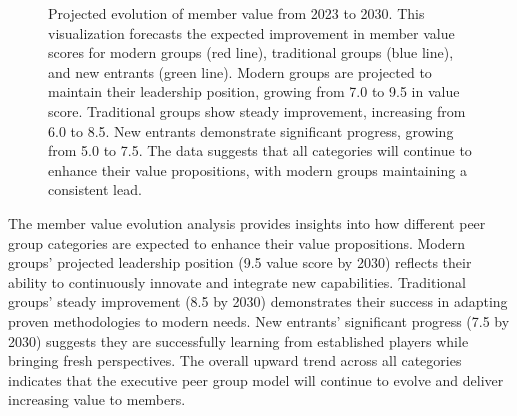 \documentclass[conference]{IEEEtran}
\begin{document}
\begin{figure}[t]
\centering
{}
\caption{Projected evolution of member value from 2023 to 2030. 
This visualization forecasts the expected improvement in member value scores for modern groups 
(red line), traditional groups (blue line), and new entrants (green line). Modern groups are 
projected to maintain their leadership position, growing from 7.0 to 9.5 in value score. 
Traditional groups show steady improvement, increasing from 6.0 to 8.5. New entrants demonstrate 
significant progress, growing from 5.0 to 7.5. The data suggests that all categories will 
continue to enhance their value propositions, with modern groups maintaining a consistent lead.}
\label{fig:value_evolution}
\end{figure}

The member value evolution analysis provides insights into how different peer group categories are expected to enhance their value propositions. Modern groups' projected leadership position (9.5 value score by 2030) reflects their ability to continuously innovate and integrate new capabilities. Traditional groups' steady improvement (8.5 by 2030) demonstrates their success in adapting proven methodologies to modern needs. New entrants' significant progress (7.5 by 2030) suggests they are successfully learning from established players while bringing fresh perspectives. The overall upward trend across all categories indicates that the executive peer group model will continue to evolve and deliver increasing value to members.
\end{document}
